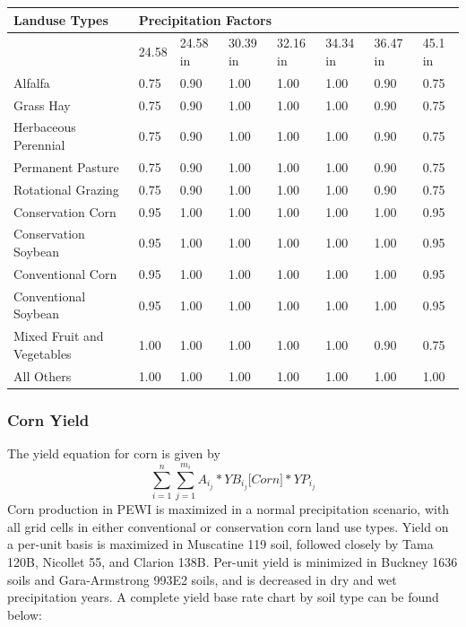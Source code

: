 \documentclass[11pt]{article}
\begin{document}
\begin{table}[!h]
\centering
\begin{tabular}{|l|l|l|l|l|l|l|l|}
\hline
 Landuse Types & \multicolumn{7}{|l|}{Precipitation Factors}\\
\hline
 & 24.58 & 24.58 in & 30.39 in & 32.16 in & 34.34 in & 36.47 in & 45.1 in \\
\hline
 Alfalfa & 0.75 & 0.90 & 1.00 & 1.00 & 1.00 & 0.90 & 0.75 \\ 
\hline
 Grass Hay & 0.75 & 0.90 & 1.00 & 1.00 & 1.00 & 0.90 & 0.75 \\
\hline
 Herbaceous Perennial & 0.75 & 0.90 & 1.00 & 1.00 & 1.00 & 0.90 & 0.75 \\
 \hline
 Permanent Pasture & 0.75 & 0.90 & 1.00 & 1.00 & 1.00 & 0.90 & 0.75 \\
 \hline
 Rotational Grazing & 0.75 & 0.90 & 1.00 & 1.00 & 1.00 & 0.90 & 0.75 \\
\hline
 Conservation Corn & 0.95 & 1.00 & 1.00 & 1.00 & 1.00 & 1.00 & 0.95 \\ 
\hline
 Conservation Soybean & 0.95 & 1.00 & 1.00 & 1.00 & 1.00 & 1.00 & 0.95 \\ 
\hline
 Conventional Corn & 0.95 & 1.00 & 1.00 & 1.00 & 1.00 & 1.00 & 0.95 \\ 
\hline
 Conventional Soybean & 0.95 & 1.00 & 1.00 & 1.00 & 1.00 & 1.00 & 0.95 \\ 
\hline
 Mixed Fruit and Vegetables & 1.00 & 1.00 & 1.00 & 1.00 & 1.00 & 0.90 & 0.75 \\ 
 \hline
 All Others & 1.00 & 1.00 & 1.00 & 1.00 & 1.00 & 1.00 & 1.00 \\
 \hline
\end{tabular}
\end{table}

\subsubsection{Corn Yield}
The yield equation for corn is given by
$$\sum_{i=1}^{n} \sum_{j=1}^{m_i} A_i_j *YB_i_j\bigg[Corn\bigg]*YP_i_j$$
Corn production in PEWI is maximized in a normal precipitation scenario, with all grid cells in either conventional or conservation corn land use types. Yield on a per-unit basis is maximized in Muscatine 119 soil, followed closely by Tama 120B, Nicollet 55, and Clarion 138B. Per-unit yield is minimized in Buckney 1636 soils and Gara-Armstrong 993E2 soils, and is decreased in dry and wet precipitation years. A complete yield base rate chart by soil type can be found below:
\end{document}
